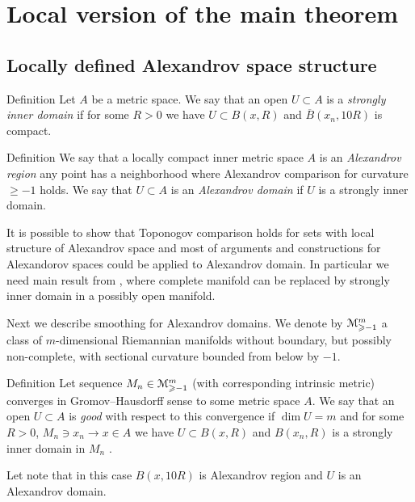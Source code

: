 \section{Local version of the main theorem}\label{sec:local}

\subsection{Locally defined Alexandrov space structure}

\begin{rdef}{Definition}
Let $A$ be a metric space. 
We say that an open  $U\subset A$
is a \emph{strongly inner domain} if
for some 
$R>0$ we have
$U\subset B(x,R)$
and $\overline{B}(x_n,10R)$ is compact.

\end{rdef}

\begin{rdef}{Definition}
We say that
 a locally compact inner metric space $A$
is an \emph{ Alexandrov region}
any point has a neighborhood where Alexandrov
comparison for curvature $\ge -1$ holds.
We say that $U\subset A$
is an \emph{ Alexandrov domain}
 if $U$ is 
 a strongly inner domain.

\end{rdef}

It is possible to show  that 
Toponogov comparison holds for sets with local structure of Alexandrov space and most of arguments and constructions for Alexandorov spaces could be applied to Alexandrov domain.
In particular we need main result from
 \cite{petrunin-SC}, where complete manifold can be replaced by 
strongly inner domain in a possibly open manifold. 
 
 
 
 Next we describe smoothing for Alexandrov domains.
 We denote by
$\mathcal M_{\geqslant -1}^m$ a class of $m$-dimensional Riemannian 
manifolds without boundary, but possibly non-complete, with sectional curvature bounded
from below by $-1$.

\begin{rdef}{Definition}
Let sequence
$M_n\in\mathcal M_{\geqslant -1}^m$ (with corresponding intrinsic metric)
converges in Gromov--Hausdorff sense to some metric space $A$.
We say that an open $U\subset A$ is \emph{good} with respect to this convergence
 if
$\dim U=m$ and for some 
$R>0$, $M_n\ni x_n\to x\in A$ we have
$U\subset B(x,R)$
and ${B(x_n,R)}$ is a strongly inner domain in
$ M_n$
. 
\end{rdef}
 Let note that in this case $B(x,10R)$ is Alexandrov region
 and $U$ is an Alexandrov domain.
 
